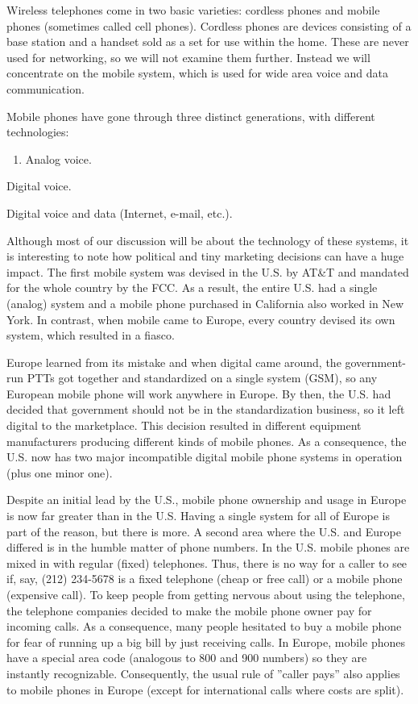 \documentclass[b5paper,11pt]{memoir}
\begin{document}
Wireless telephones come in two basic varieties: cordless phones and
mobile phones (sometimes called {cell phones}). {Cordless phones} are
devices consisting of a base station and a handset sold as a set for use
within the home. These are never used for networking, so we will not
examine them further. Instead we will concentrate on the mobile system,
which is used for wide area voice and data communication.

{Mobile phones} have gone through three distinct generations, with
different technologies:

{}

\begin{enumerate}
\def\labelenumi{\arabic{enumi}.}
\item
  {}

  Analog voice.
\end{enumerate}

{}

Digital voice.

{}

Digital voice and data (Internet, e-mail, etc.).

Although most of our discussion will be about the technology of these
systems, it is interesting to note how political and tiny marketing
decisions can have a huge impact. The first mobile system was devised in
the U.S. by AT\&T and mandated for the whole country by the FCC. As a
result, the entire U.S. had a single (analog) system and a mobile phone
purchased in California also worked in New York. In contrast, when
mobile came to Europe, every country devised its own system, which
resulted in a fiasco.

Europe learned from its mistake and when digital came around, the
government-run PTTs got together and standardized on a single system
(GSM), so any European mobile phone will work anywhere in Europe. By
then, the U.S. had decided that government should not be in the
standardization business, so it left digital to the marketplace. This
decision resulted in different equipment manufacturers producing
different kinds of mobile phones. As a consequence, the U.S. now has two
major incompatible digital mobile phone systems in operation (plus one
minor one).

Despite an initial lead by the U.S., mobile phone ownership and usage in
Europe is now far greater than in the U.S. Having a single system for
all of Europe is part of the reason, but there is more. A second area
where the U.S. and Europe differed is in the humble matter of phone
numbers. In the U.S. mobile phones are mixed in with regular (fixed)
telephones. Thus, there is no way for a caller to see if, say, (212)
234-5678 is a fixed telephone (cheap or free call) or a mobile phone
(expensive call). To keep people from getting nervous about using the
telephone, the telephone companies decided to make the mobile phone
owner pay for incoming calls. As a consequence, many people hesitated to
buy a mobile phone for fear of running up a big bill by just receiving
calls. In Europe, mobile phones have a special area code (analogous to
800 and 900 numbers) so they are instantly recognizable. Consequently,
the usual rule of ''caller pays'' also applies to mobile phones in
Europe (except for international calls where costs are split).
\end{document}
